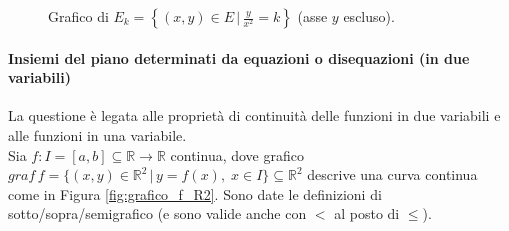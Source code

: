 \begin{example}
\begin{enumerate}
\begin{figure}
            \caption{Grafico di $E_k=\left\{(x,y)\in E\,|\, \frac{y}{x^2}=k\right\}$ (asse $y$ escluso).}\label{fig:esempio_E_k}
        \end{figure}
    \end{enumerate}
\end{example}

\paragraph{Insiemi del piano determinati da equazioni o disequazioni (in due variabili)} La questione è legata alle proprietà di continuità delle funzioni in due variabili e alle funzioni in una variabile.\\
Sia $f\colon I=[a,b]\subseteq\mathbb R\rightarrow\mathbb R$ continua, dove grafico $graf\, f=\{(x,y)\in\mathbb R^2\,|\, y=f(x),\; x\in I\}\subseteq\mathbb R^2$ descrive una curva \footnotemark continua come in Figura \ref{fig:grafico_f_R2}. Sono date le definizioni di sotto/sopra/semigrafico (e sono valide anche con $<$ al posto di $\leq$).

